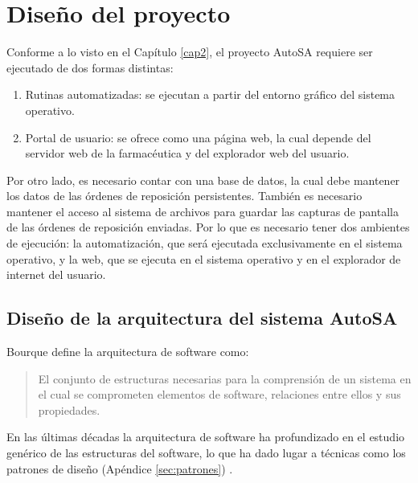 \chapter{Diseño del proyecto}\label{cap3}
Conforme a lo visto en el Capítulo \ref{cap2}, el proyecto AutoSA requiere ser ejecutado de dos formas distintas:
\begin{enumerate}
 	\item Rutinas automatizadas: se ejecutan a partir del entorno gráfico del sistema operativo.
 	\item Portal de usuario: se ofrece como una página web, la cual depende del servidor web de la farmacéutica y del explorador web del usuario.
\end{enumerate}
Por otro lado, es necesario contar con una base de datos, la cual debe mantener los datos de las órdenes de reposición persistentes. También es necesario mantener el acceso al sistema de archivos para guardar las capturas de pantalla de las órdenes de reposición enviadas. Por lo que es necesario tener dos ambientes de ejecución: la automatización, que será ejecutada exclusivamente en el sistema operativo, y la web, que se ejecuta en el sistema operativo y en el explorador de internet del usuario.
\section{Diseño de la arquitectura del sistema AutoSA}
Bourque\cite{SWEBOOK} define la arquitectura de software como:
\begin{quote}
	El conjunto de estructuras necesarias para la comprensión de un sistema en el cual se comprometen elementos de software, relaciones entre ellos y sus propiedades.
\end{quote}
En las últimas décadas la arquitectura de software ha profundizado en el estudio genérico de las estructuras del software, lo que ha dado lugar a técnicas como los patrones de diseño (Apéndice \ref{sec:patrones}) \cite{SWEBOOK, SoftwareArchitectureInAction}.
